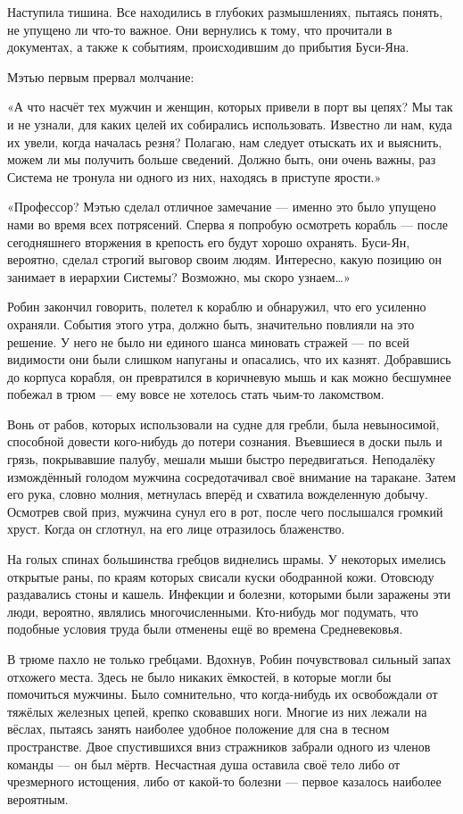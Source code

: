 \documentclass[a5paper, 9pt,
final, openany, twoside=true]{memoir}
\begin{document}
Наступила тишина. Все находились в глубоких размышлениях, пытаясь понять, не упущено ли что-то важное. Они вернулись к тому, что прочитали в документах, а также к событиям, происходившим до прибытия Буси-Яна.

Мэтью первым прервал молчание:

«А что насчёт тех мужчин и женщин, которых привели в порт вы цепях? Мы так и не узнали, для каких целей их собирались использовать. Известно ли нам, куда их увели, когда началась резня? Полагаю, нам следует отыскать их и выяснить, можем ли мы получить больше сведений. Должно быть, они очень важны, раз Система не тронула ни одного из них, находясь в приступе ярости.»

«Профессор? Мэтью сделал отличное замечание — именно это было упущено нами во время всех потрясений. Сперва я попробую осмотреть корабль — после сегодняшнего вторжения в крепость его будут хорошо охранять. Буси-Ян, вероятно, сделал строгий выговор своим людям. Интересно, какую позицию он занимает в иерархии Системы? Возможно, мы скоро узнаем…»

Робин закончил говорить, полетел к кораблю и обнаружил, что его усиленно охраняли. События этого утра, должно быть, значительно повлияли на это решение. У него не было ни единого шанса миновать стражей — по всей видимости они были слишком напуганы и опасались, что их казнят. Добравшись до корпуса корабля, он превратился в коричневую мышь и как можно бесшумнее побежал в трюм — ему вовсе не хотелось стать чьим-то лакомством.

Вонь от рабов, которых использовали на судне для гребли, была невыносимой, способной довести кого-нибудь до потери сознания. Въевшиеся в доски пыль и грязь, покрывавшие палубу, мешали мыши быстро передвигаться. Неподалёку измождённый голодом мужчина сосредотачивал своё внимание на таракане. Затем его рука, словно молния, метнулась вперёд и схватила вожделенную добычу. Осмотрев свой приз, мужчина сунул его в рот, после чего послышался громкий хруст. Когда он сглотнул, на его лице отразилось блаженство.

На голых спинах большинства гребцов виднелись шрамы. У некоторых имелись открытые раны, по краям которых свисали куски ободранной кожи. Отовсюду раздавались стоны и кашель. Инфекции и болезни, которыми были заражены эти люди, вероятно, являлись многочисленными. Кто-нибудь мог подумать, что подобные условия труда были отменены ещё во времена Средневековья.

В трюме пахло не только гребцами. Вдохнув, Робин почувствовал сильный запах отхожего места. Здесь не было никаких ёмкостей, в которые могли бы помочиться мужчины. Было сомнительно, что когда-нибудь их освобождали от тяжёлых железных цепей, крепко сковавших ноги. Многие из них лежали на вёслах, пытаясь занять наиболее удобное положение для сна в тесном пространстве. Двое спустившихся вниз стражников забрали одного из членов команды — он был мёртв. Несчастная душа оставила своё тело либо от чрезмерного истощения, либо от какой-то болезни — первое казалось наиболее вероятным.\bigskip
\end{document}
